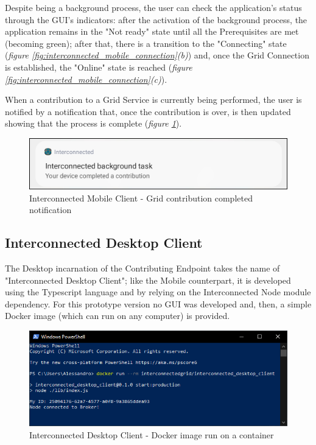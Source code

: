 \vspace{5mm}

Despite being a background process, the user can check the application's status through the GUI's indicators: after the activation of the background process, the application remains in the "Not ready" state until all the Prerequisites are met (becoming green); after that, there is a transition to the "Connecting" state (\textit{figure \ref{fig:interconnected_mobile_connection}(b)}) and, once the Grid Connection is established, the "Online" state is reached (\textit{figure \ref{fig:interconnected_mobile_connection}(c)}).

When a contribution to a Grid Service is currently being performed, the user is notified by a notification that, once the contribution is over, is then updated showing that the process is complete (\textit{figure \ref{fig:notification_completed}}).

\begin{figure}[!ht]
    \centering
    \includegraphics[scale=0.35]{document/chapters/chapter_7/images/notification_completed.png}
    \caption{Interconnected Mobile Client - Grid contribution completed notification}
    \label{fig:notification_completed}
\end{figure}

\subsection{Interconnected Desktop Client}
The Desktop incarnation of the Contributing Endpoint takes the name of "Interconnected Desktop Client"; like the Mobile counterpart, it is developed using the Typescript language and by relying on the Interconnected Node module dependency. For this prototype version no GUI was developed and, then, a simple Docker image (which can run on any computer) is provided.

\begin{figure}[!ht]
    \centering
    \includegraphics[scale=0.8]{document/chapters/chapter_7/images/interconnected_desktop.png}
    \caption{Interconnected Desktop Client - Docker image run on a container}
    \label{fig:interconnected_desktop}
\end{figure}

